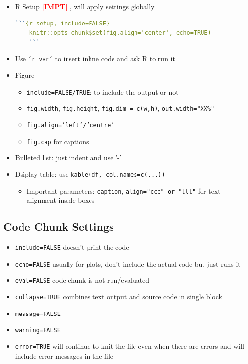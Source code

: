 \documentclass{article}
\newcommand{\impt}[0]{\textcolor{red}{\textbf{[IMPT] }}}
\begin{document}
\begin{multicols}{2}
\begin{itemize}
	\item R Setup \impt , will apply settings globally
	\begin{lstlisting}[language=R]
	```{r setup, include=FALSE}
	knitr::opts_chunk$set(fig.align='center', echo=TRUE)
	```\end{lstlisting}
	\item Use \texttt{`r var`} to insert inline code and ask R to run it
	\item Figure
	\begin{itemize}
		\item \texttt{include=FALSE/TRUE}: to include the output or not
		\item \texttt{fig.width}, \texttt{fig.height}, \texttt{fig.dim = c(w,h)}, \texttt{out.width="XX\%"}
		\item \texttt{fig.align='left'/'centre'}
		\item \texttt{fig.cap} for captions
	\end{itemize}
	\item Bulleted list: just indent and use '-'
	\item Dsiplay table: use \texttt{kable(df, col.names=c(...))}
	\begin{itemize}
		\item Important parameters: \texttt{caption}, \texttt{align="ccc" or "lll"} for text alignment inside boxes
	\end{itemize}
\end{itemize}

\subsection*{Code Chunk Settings}
\begin{itemize}
	\item \texttt{include=FALSE} doesn't print the code
	\item \texttt{echo=FALSE} usually for plots, don't include the actual code but just runs it
	\item \texttt{eval=FALSE} code chunk is not run/evaluated
	\item \texttt{collapse=TRUE} combines text output and source code in single block
	\item \texttt{message=FALSE}
	\item \texttt{warning=FALSE}
	\item \texttt{error=TRUE} will continue to knit the file even when there are errors and will include error messages in the file
\end{itemize}


\end{multicols}
\end{document}
